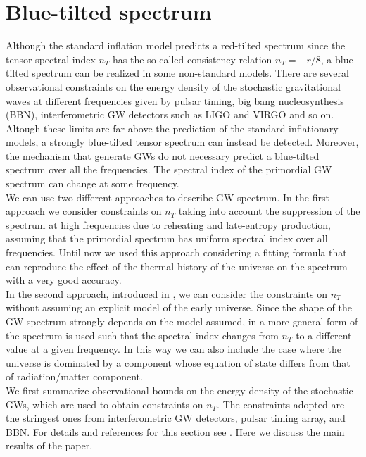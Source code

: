 \documentclass[11pt,a4paper,twoside]{book}
\begin{document}
\section{Blue-tilted spectrum}
Although the standard inflation model predicts a red-tilted spectrum since the tensor spectral index $ n_{T} $ has the so-called consistency relation $ n_{T}=-r/8 $, a blue-tilted spectrum can be realized in some non-standard models. There are several observational constraints on the energy density of the stochastic gravitational waves at different frequencies given by pulsar timing, big bang nucleosynthesis (BBN), interferometric GW detectors such as LIGO and VIRGO and so on. Altough these limits are far above the prediction of the standard inflationary models, a strongly blue-tilted tensor spectrum can instead  be detected. Moreover, the mechanism that generate GWs do not necessary  predict a blue-tilted spectrum over all the frequencies. The spectral index of the primordial GW spectrum can change at some frequency. \\
We can use two different approaches to describe GW spectrum. In the first approach we consider constraints on $ n_{T} $ taking into account the suppression of the spectrum at high frequencies due to reheating and late-entropy production, assuming that the primordial spectrum has uniform spectral index over all frequencies. Until now we used this approach considering a fitting formula that can reproduce the effect of the thermal history of the universe on the spectrum with a very good accuracy.\\
In the second approach, introduced in \cite{Chap3:BlueTiltedSpectrum},  we can consider the constraints on $ n_{T} $ without assuming an explicit model of the early universe. Since the shape of the GW spectrum strongly depends on the model assumed, in \cite{Chap3:BlueTiltedSpectrum}
a more general form of the spectrum  is used such that the spectral index changes from $ n_{T} $ to a different value at a given frequency. In this way we can also include the case where the universe is dominated by a component whose equation of state differs from that of radiation/matter component.\\
We first summarize observational bounds on the energy density of the stochastic GWs, which are used to obtain constraints on $ n_{T} $. The constraints adopted are the stringest ones from interferometric GW detectors, pulsar timing array, and BBN. For details and references for this section see \cite{Chap3:BlueTiltedSpectrum}. Here we discuss the main results of the paper.
\end{document}
